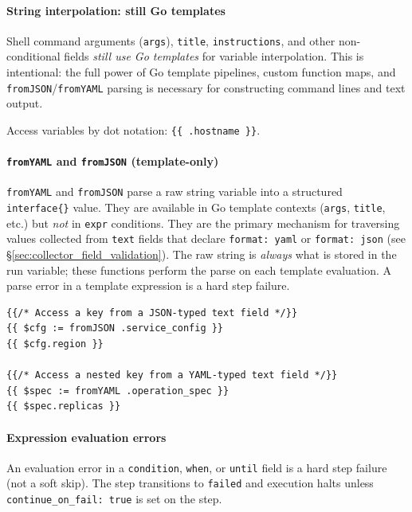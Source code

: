 \paragraph{String interpolation: still Go templates}

Shell command arguments (\texttt{args}), \texttt{title}, \texttt{instructions},
and other non-conditional fields \emph{still use Go templates} for variable
interpolation.  This is intentional: the full power of Go template pipelines,
custom function maps, and \texttt{fromJSON}/\texttt{fromYAML} parsing is
necessary for constructing command lines and text output.

Access variables by dot notation:
\texttt{\{\{\ .hostname\ \}\}}.

\paragraph{\texttt{fromYAML} and \texttt{fromJSON} (template-only)}
\texttt{fromYAML} and \texttt{fromJSON} parse a raw string variable into a structured
\texttt{interface\{\}} value.  They are available in Go template contexts
(\texttt{args}, \texttt{title}, etc.) but \emph{not} in \texttt{expr} conditions.
They are the primary mechanism for traversing values collected from \texttt{text}
fields that declare \texttt{format: yaml} or \texttt{format: json} (see
§\ref{sec:collector_field_validation}).  The raw string is \emph{always} what is
stored in the run variable; these functions perform the parse on each template
evaluation.  A parse error in a template expression is a hard step failure.

\begin{verbatim}
{{/* Access a key from a JSON-typed text field */}}
{{ $cfg := fromJSON .service_config }}
{{ $cfg.region }}

{{/* Access a nested key from a YAML-typed text field */}}
{{ $spec := fromYAML .operation_spec }}
{{ $spec.replicas }}
\end{verbatim}

\paragraph{Expression evaluation errors}

An evaluation error in a \texttt{condition}, \texttt{when}, or \texttt{until}
field is a hard step failure (not a soft skip).  The step transitions to
\texttt{failed} and execution halts unless \texttt{continue\_on\_fail: true} is
set on the step.


